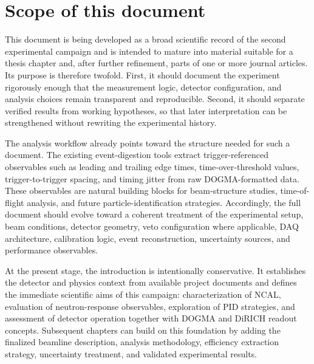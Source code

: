 \section{Scope of this document}

This document is being developed as a broad scientific record of the second experimental campaign and is intended to mature into material suitable for a thesis chapter and, after further refinement, parts of one or more journal articles. Its purpose is therefore twofold. First, it should document the experiment rigorously enough that the measurement logic, detector configuration, and analysis choices remain transparent and reproducible. Second, it should separate verified results from working hypotheses, so that later interpretation can be strengthened without rewriting the experimental history.

The analysis workflow already points toward the structure needed for such a document. The existing event-digestion tools extract trigger-referenced observables such as leading and trailing edge times, time-over-threshold values, trigger-to-trigger spacing, and timing jitter from raw DOGMA-formatted data. These observables are natural building blocks for beam-structure studies, time-of-flight analysis, and future particle-identification strategies. Accordingly, the full document should evolve toward a coherent treatment of the experimental setup, beam conditions, detector geometry, veto configuration where applicable, DAQ architecture, calibration logic, event reconstruction, uncertainty sources, and performance observables.

At the present stage, the introduction is intentionally conservative. It establishes the detector and physics context from available project documents and defines the immediate scientific aims of this campaign: characterization of NCAL, evaluation of neutron-response observables, exploration of PID strategies, and assessment of detector operation together with DOGMA and DiRICH readout concepts. Subsequent chapters can build on this foundation by adding the finalized beamline description, analysis methodology, efficiency extraction strategy, uncertainty treatment, and validated experimental results.